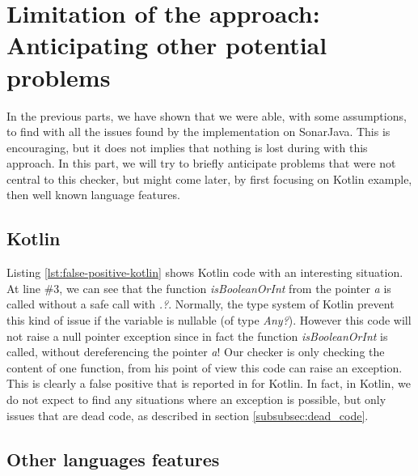 \section{Limitation of the approach: Anticipating other potential problems}
\label{sec:anticipating_problems}

In the previous parts, we have shown that we were able, with some assumptions, to find with \slang all the issues found by the implementation on SonarJava. 
This is encouraging, but it does not implies that nothing is lost during with this approach.
In this part, we will try to briefly anticipate problems that were not central to this checker, but might come later, by first focusing on Kotlin example, then well known language features.

\subsection{Kotlin}
\label{subsec:kotlin}



Listing \ref{lst:false-positive-kotlin} shows Kotlin code with an interesting situation. 
At line $\#3$, we can see that the function \emph{isBooleanOrInt} from the pointer \emph{a} is called without a safe call with \emph{.?}. 
Normally, the type system of Kotlin prevent this kind of issue if the variable is nullable (of type \emph{Any?}). 
However this code will not raise a null pointer exception since in fact the function \emph{isBooleanOrInt} is called, without dereferencing the pointer \emph{a}! 
Our checker is only checking the content of one function, from his point of view this code can raise an exception. 
This is clearly a false positive that is reported in for Kotlin. 
In fact, in Kotlin, we do not expect to find any situations where an exception is possible, but only issues that are dead code, as described in section \ref{subsubsec:dead_code}.

\subsection{Other languages features}
\label{subsec:other_language_features}

